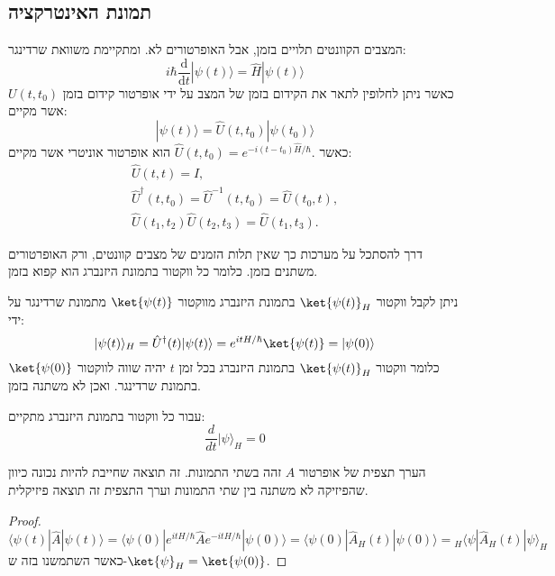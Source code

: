 \documentclass{tstextbook}
\begin{document}
\subsection{תמונת האינטרקציה}

\begin{reminder}
המצבים הקוונטים תלויים בזמן, אבל האופרטורים לא. ומתקיימת משוואת שרדינגר:
$$i\hbar{\frac{\mathrm{d}}{\mathrm{d} t}}|\psi(t)\rangle={\hat{H}}|\psi(t)\rangle$$
כאשר ניתן לחלופין לתאר את הקידום בזמן של המצב על ידי אופרטור קידום בזמן \(U(t,t_{0})\) אשר מקיים:
$$|\psi(t)\rangle=\hat{U}(t,t_{0})|\psi(t_{0})\rangle$$
כאשר \(\hat{U}(t,t_{0})=e^{-i(t-t_{0})\hat{H}/\hbar}.\) הוא אופרטור אוניטרי אשר מקיים:
$$\begin{array}{c}{{\hat{U}(t,t)=I,}}\\ {{\hat{U}^{\dagger}(t,t_{0})=\hat{U}^{-1}(t,t_{0})=\hat{U}(t_{0},t),}}\\ {{\hat{U}(t_{1},t_{2})\hat{U}(t_{2},t_{3})=\hat{U}(t_{1},t_{3}).}}\end{array}$$

\end{reminder}
\begin{definition}
דרך להסתכל על מערכות כך שאין תלות הזמנים של מצבים קוונטים, ורק האופרטורים משתנים בזמן. כלומר כל ווקטור בתמונת היזנברג הוא קפוא בזמן.

\end{definition}
\begin{proposition}
ניתן לקבל ווקטור \(\ket{\psi(t)}_{H}\) בתמונת היזנברג מווקטור \(\ket{\psi(t)}\) מתמונת שרדינגר על ידי:
$$|\psi(t)\rangle_{H}=\hat{U}^{\dagger}(t)|\psi(t)\rangle=e^{ itH/\hbar }\ket{\psi(t)} =|\psi(0)\rangle$$
כלומר ווקטור \(\ket{\psi(t)}_{H}\) בתמונת היזנברג בכל זמן \(t\) יהיה שווה לווקטור \(\ket{\psi(0)}\) בתמונת שרדינגר. ואכן לא משתנה בזמן.

\end{proposition}
\begin{corollary}
עבור כל ווקטור בתמונת היזנברג מתקיים:
$${\frac{d}{d t}}|\psi\rangle_{H}=0$$

\end{corollary}
\begin{proposition}
הערך תצפית של אופרטור \(A\) זהה בשתי התמונות. זה תוצאה שחייבת להיות נכונה כיוון שהפיזיקה לא משתנה בין שתי התמונות וערך התצפית זה תוצאה פיזיקלית.

\end{proposition}
\begin{proof}
$$\langle\psi(t)|\hat{A}|\psi(t)\rangle=\langle\psi(0)|e^{i t H/\hbar}\hat{A}e^{-i t H/\hbar}|\psi(0)\rangle=\langle\psi(0)|\hat{A}_{H}(t)|\psi(0)\rangle={}_{H}\langle\psi|\hat{A}_{H}(t)|\psi\rangle_{H}$$
כאשר השתמשנו בזה ש-\(\ket{\psi}_{H}=\ket{\psi(0)}\).

\end{proof}
\end{document}
